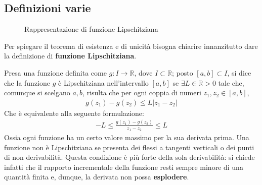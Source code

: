 \documentclass[a4paper, oneside]{book}
\begin{document}
\subsection{Definizioni varie}
\begin{figure}
    \centering
    \caption{Rappresentazione di funzione Lipschitziana}
\end{figure}
Per spiegare il teorema di esistenza e di unicità bisogna chiarire innanzitutto dare la
definizione di \textbf{funzione Lipschitziana}.
\begin{definition}
    Presa una funzione definita come $g : I \to \mathbb{R}$, dove $I \subset \mathbb{R}$; posto
    $[a, b] \subset I$, si dice che la funzione $g$ è Lipschitziana nell'intervallo $[a, b]$ se
    $\exists L \in \mathbb{R} > 0$ tale che, comunque si scelgano $a, b$, risulta che
    per ogni coppia di numeri $z_1, z_2 \in [a, b]$, 
    \begin{align}
        g(z_1) - g(z_2) \leq L|z_1 - z_2|
    \end{align}
    Che è equivalente alla seguente formulazione:
    \begin{align}
        -L \leq \frac{g(z_1) - g(z_2)}{z_1 - z_2} \leq L
    \end{align}
    Ossia ogni funzione ha un certo valore massimo per la sua derivata
    prima. Una funzione non è Lipschitziana se presenta dei flessi a tangenti verticali o dei
    punti di non derivabilità. Questa condizione è più forte della sola derivabilità:
    si chiede infatti che il rapporto incrementale della funzione resti sempre minore di una quantità finita e, dunque, la derivata non possa \textbf{esplodere}.
\end{definition}
\end{document}

